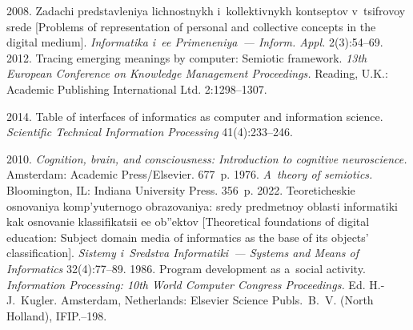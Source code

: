 {\begin{multicols}{2}
{{\begin{thebibliography}{99}
 2008. Zadachi 
predstavleniya lichnostnykh i~kollektivnykh kon\-tsep\-tov v~tsifrovoy srede 
[Problems of representation of personal and collective concepts in the digital 
medium]. \textit{Informatika i~ee Primeneniya~---  Inform. Appl.} 2(3):54--69.
 2012. Tracing emerging meanings by computer: Semiotic 
framework. \textit{13th European Conference on Knowledge Management 
Proceedings.} Reading, U.K.: Academic Publishing International Ltd.  
2:1298--1307.

 2014. Table of interfaces of informatics as computer and 
information science. \textit{Scientific Technical Information Processing} 
 41(4):233--246.
 
 2010. \textit{Cognition, brain, and 
consciousness: Introduction to cognitive neuroscience.} Amsterdam: Academic 
Press/Elsevier. 677~p.
 1976. \textit{A~theory of semiotics.} Bloomington, IL: Indiana 
University Press. 356~p.
 2022. Teoreticheskie osnovaniya komp'yu\-ter\-no\-go 
obrazovaniya: sredy predmetnoy ob\-lasti informatiki kak osnovanie klassifikatsii 
ee ob''\-ek\-tov [Theoretical foundations of digital education: Subject domain media 
of informatics as the base of its objects' classification]. \textit{Sistemy i~Sredstva 
Informatiki~--- Systems and Means of Informatics} 32(4):77--89.
 1986. Program development as a~social activity.  
\textit{Information Processing: 10th World Computer Congress Proceedings.} Ed. H.-J.~Kugler.  
Amsterdam, Netherlands: Elsevier Science Publs.\ B.~V. (North Holland), IFIP.--198.

\columnbreak


\end{thebibliography}}}
\end{multicols}}
